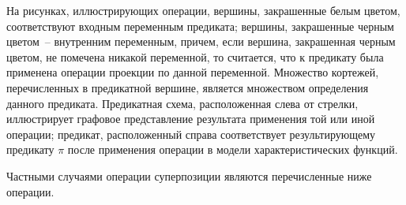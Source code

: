 \documentclass[12pt]{article}
\begin{document}
На рисунках, иллюстрирующих операции, вершины, закрашенные белым цветом, соответствуют входным переменным предиката; 
вершины, закрашенные черным цветом~-- внутренним переменным, причем, если вершина, закрашенная черным цветом, не 
помечена никакой переменной, то считается, что к предикату была применена операции проекции по данной переменной.
Множество кортежей, перечисленных в предикатной вершине, является множеством определения данного предиката. 
Предикатная схема, расположенная слева от стрелки, иллюстрирует графовое представление результата применения той или иной
операции; предикат, расположенный справа соответствует результирующему предикату $\pi$ после применения операции 
в модели характеристических функций.

Частными случаями операции суперпозиции являются перечисленные ниже операции.
\end{document}
